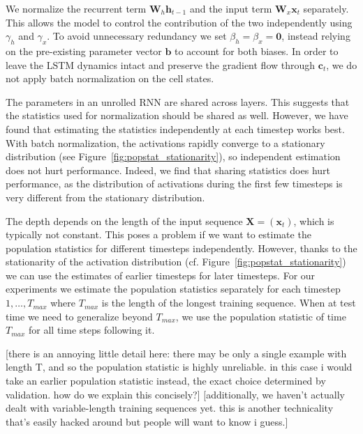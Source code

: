 \documentclass{article} %
\newcommand{\vect}[1]{\mathbf{#1}}
\newcommand{\mat}[1]{\mathbf{#1}}
\begin{document}

We normalize the recurrent term $\mat{W}_h \vect{h}_{t-1}$ and the input term $\mat{W}_x \vect{x}_t$ separately.
This allows the model to control the contribution of the two independently using $\gamma_h$ and $\gamma_x$.
To avoid unnecessary redundancy we set $\beta_h = \beta_x = \vect{0}$, instead relying on the pre-existing parameter vector $\vect{b}$ to account for both biases.
In order to leave the LSTM dynamics intact and preserve the gradient flow through $\vect{c}_t$, we do not apply batch normalization on the cell states.




The parameters in an unrolled RNN are shared across layers.
This suggests that the statistics used for normalization should be shared as well.
However, we have found that estimating the statistics independently at each timestep works best.
With batch normalization, the activations rapidly converge to a stationary distribution (see Figure~\ref{fig:popstat_stationarity}), so independent estimation does not hurt performance.
Indeed, we find that sharing statistics does hurt performance, as the distribution of activations during the first few timesteps is very different from the stationary distribution.

The depth depends on the length of the input sequence $\mat{X} = (\vect{x}_t)$, which is typically not constant.
This poses a problem if we want to estimate the population statistics for different timesteps independently.
However, thanks to the stationarity of the activation distribution (cf. Figure~\ref{fig:popstat_stationarity}) we can use the estimates of earlier timesteps for later timesteps.
For our experiments we estimate the population statistics separately for each timestep $1, \ldots, T_{max}$ where $T_{max}$ is the length of the longest training sequence.
When at test time we need to generalize beyond $T_{max}$, we use the population statistic of time $T_{max}$ for all time steps following it.

[there is an annoying little detail here: there may be only a single example with length T, and so the population statistic is highly unreliable. in this case i would take an earlier population statistic instead, the exact choice determined by validation. how do we explain this concisely?]
[additionally, we haven't actually dealt with variable-length training sequences yet. this is another technicality that's easily hacked around but people will want to know i guess.]
\end{document}
